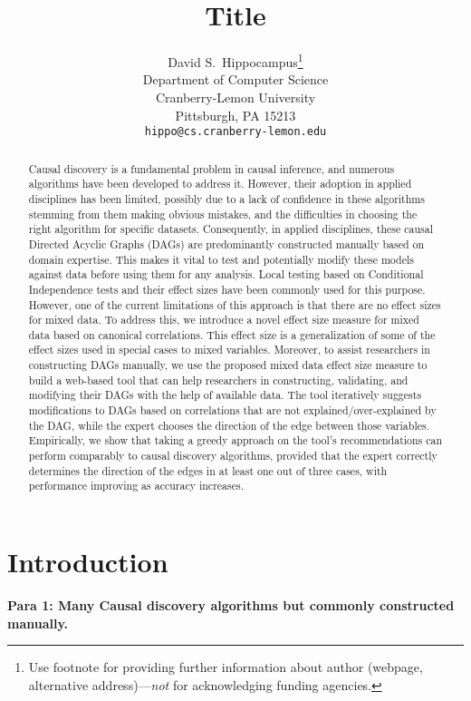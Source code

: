 \documentclass{article}
\title{Title}
\author{%
  David S.~Hippocampus\thanks{Use footnote for providing further information
    about author (webpage, alternative address)---\emph{not} for acknowledging
    funding agencies.} \\
  Department of Computer Science\\
  Cranberry-Lemon University\\
  Pittsburgh, PA 15213 \\
  \texttt{hippo@cs.cranberry-lemon.edu} \\
}
\begin{document}
\maketitle

\begin{abstract}
	Causal discovery is a fundamental problem in causal inference, and
	numerous algorithms have been developed to address it. However, their
	adoption in applied disciplines  has been limited, possibly due to a
	lack of confidence in these algorithms stemming from them making
	obvious mistakes, and the difficulties in choosing the right algorithm
	for specific datasets. Consequently, in applied disciplines, these
	causal Directed Acyclic Graphs (DAGs) are predominantly constructed
	manually based on domain expertise. This makes it vital to test and
	potentially modify these models against data before using them for any
	analysis. Local testing based on Conditional Independence tests and
	their effect sizes have been commonly used for this purpose. However,
	one of the current limitations of this approach is that there are no
	effect sizes for mixed data. To address this, we introduce a novel
	effect size measure for mixed data based on canonical correlations.
	This effect size is a generalization of some of the effect sizes used
	in special cases to mixed variables. Moreover, to assist researchers in
	constructing DAGs manually, we use the proposed mixed data effect size
	measure to build a web-based tool that can help researchers in
	constructing, validating, and modifying their DAGs with the help of
	available data. The tool iteratively suggests modifications to DAGs
	based on correlations that are not explained/over-explained by the DAG,
	while the expert chooses the direction of the edge between those
	variables. Empirically, we show that taking a greedy approach on the
	tool's recommendations can perform comparably to causal discovery
	algorithms, provided that the expert correctly determines the direction
	of the edges in at least one out of three cases, with performance
	improving as accuracy increases.
\end{abstract}

\section{Introduction}
\textbf{Para 1: Many Causal discovery algorithms but commonly constructed manually.}

\end{document}
